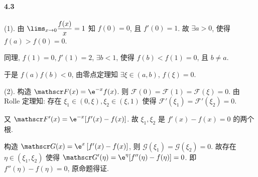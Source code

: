 \paragraph*{4.3}

(1). 由 $\lims_{x\to 0}\dfrac{f(x)}{x}=1$ 知 $f(0)=0$, 且 $f'(0)=1$. 故 $\exists a>0$, 使得 $f(a)>f(0)=0$.

同理, $f(1)=0,f'(1)=2$, $\exists b<1$, 使得 $f(b)<f(1)=0$, 且 $b\neq a$.

于是 $f(a)f(b)<0$, 由零点定理知 $\exists \xi \in (a,b)$, $f(\xi)=0$.

(2). 构造 $\mathscr F(x)=\e^{-x}f(x)$. 则 $\mathscr F(0)=\mathscr F(1)=\mathscr F(\xi)=0$. 由 Rolle 定理知: 存在 $\xi_1\in(0,\xi),\xi_2\in(\xi,1)$ 使得 $\mathscr F'(\xi_1)=\mathscr F'(\xi_2)=0$.

又 $\mathscr F'(x)=\e^{-x}[f'(x)-f(x)]$. 故 $\xi_1,\xi_2$ 是 $f'(x)-f(x)=0$ 的两个根.

构造 $\mathscr G(x)=\e^{x}\left[f'(x)-f(x)\right]$, 则 $\mathscr G(\xi_1)=\mathscr G(\xi_2)=0$. 故存在 $\eta\in(\xi_1,\xi_2)$ 使得 $\mathscr G'(\eta)=\e^{\eta}[f''(\eta)-f(\eta)]=0$. 即 $f''(\eta)-f(\eta)=0$, 原命题得证.